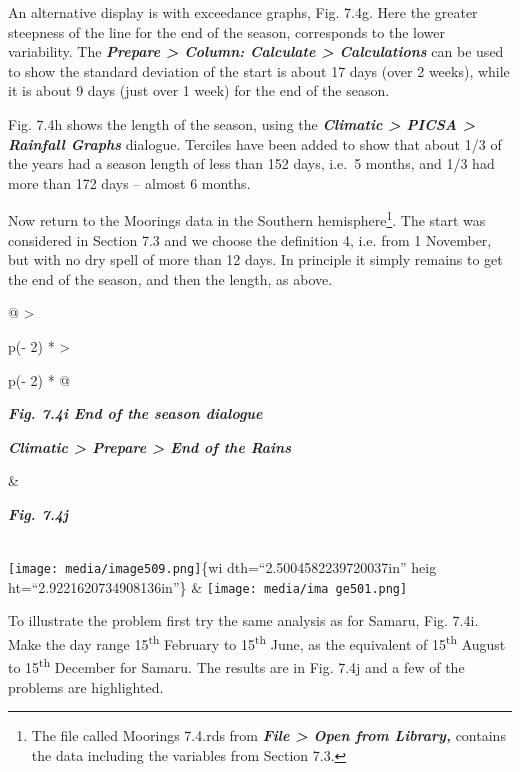 \documentclass[
  letterpaper,
  DIV=11,
  numbers=noendperiod]{scrreprt}
\begin{document}
An alternative display is with exceedance graphs, Fig. 7.4g. Here the
greater steepness of the line for the end of the season, corresponds to
the lower variability. The \textbf{\emph{Prepare \textgreater{} Column:
Calculate \textgreater{} Calculations}} can be used to show the standard
deviation of the start is about 17 days (over 2 weeks), while it is
about 9 days (just over 1 week) for the end of the season.

Fig. 7.4h shows the length of the season, using the
\textbf{\emph{Climatic \textgreater{} PICSA \textgreater{} Rainfall
Graphs}} dialogue. Terciles have been added to show that about 1/3 of
the years had a season length of less than 152 days, i.e.~5 months, and
1/3 had more than 172 days -- almost 6 months.

Now return to the Moorings data in the Southern hemisphere\footnote{The
  file called Moorings 7.4.rds from \textbf{\emph{File \textgreater{}
  Open from Library,}} contains the data including the variables from
  Section 7.3.}. The start was considered in Section 7.3 and we choose
the definition 4, i.e. from 1 November, but with no dry spell of more
than 12 days. In principle it simply remains to get the end of the
season, and then the length, as above.

\begin{longtable}[]{@{}
  >{\raggedright\arraybackslash}p{(\columnwidth - 2\tabcolsep) * }
  >{\raggedright\arraybackslash}p{(\columnwidth - 2\tabcolsep) * }@{}}
\toprule\noalign{}
\begin{minipage}[b]{\linewidth}\raggedright
\textbf{\emph{Fig. 7.4i End of the season dialogue}}

\textbf{\emph{Climatic \textgreater{} Prepare \textgreater{} End of the
Rains}}
\end{minipage} & \begin{minipage}[b]{\linewidth}\raggedright
\textbf{\emph{Fig. 7.4j}}
\end{minipage} \\
\midrule\noalign{}
\endhead
\bottomrule\noalign{}
\endlastfoot
\texttt{[image: media/image509.png]}\{wi dth=``2.5004582239720037in''
heig ht=``2.9221620734908136in''\} &
\texttt{[image: media/ima ge501.png]} \\
\end{longtable}

To illustrate the problem first try the same analysis as for Samaru,
Fig. 7.4i. Make the day range 15\textsuperscript{th} February to
15\textsuperscript{th} June, as the equivalent of 15\textsuperscript{th}
August to 15\textsuperscript{th} December for Samaru. The results are in
Fig. 7.4j and a few of the problems are highlighted.
\end{document}
